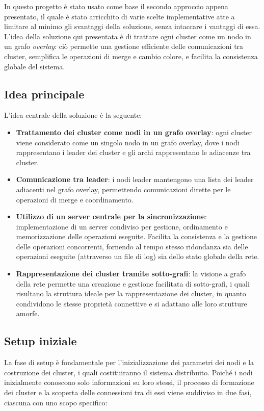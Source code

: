 \documentclass[12pt, a4paper]{report}
\begin{document}
In questo progetto \`e stato usato come base il secondo approccio appena presentato, il quale \`e stato arricchito di varie scelte implementative atte a limitare al minimo gli svantaggi della soluzione, senza intaccare i vantaggi di essa. L'idea della soluzione qui presentata \`e di trattare ogni cluster come un nodo in un grafo \emph{overlay}: ci\`o permette una gestione efficiente delle comunicazioni tra cluster, semplifica le operazioni di merge e cambio colore, e facilita la consistenza globale del sistema.

\subsection{Idea principale}

L'idea centrale della soluzione \`e la seguente:

\begin{itemize}
    \item \textbf{Trattamento dei cluster come nodi in un grafo overlay}: ogni cluster viene considerato come un singolo nodo in un grafo overlay, dove i nodi rappresentano i leader dei cluster e gli archi rappresentano le adiacenze tra cluster.
    \item \textbf{Comunicazione tra leader}: i nodi leader mantengono una lista dei leader adiacenti nel grafo overlay, permettendo comunicazioni dirette per le operazioni di merge e coordinamento.
    \item \textbf{Utilizzo di un server centrale per la sincronizzazione}: implementazione di un server condiviso per gestione, ordinamento e memorizzazione delle operazioni eseguite. Facilita la consistenza e la gestione delle operazioni concorrenti, fornendo al tempo stesso ridondanza sia delle operazioni eseguite (attraverso un file di log) sia dello stato globale della rete.
    \item \textbf{Rappresentazione dei cluster tramite sotto-grafi}: la visione a grafo della rete permette una creazione e gestione facilitata di sotto-grafi, i quali risultano la struttura ideale per la rappresentazione dei cluster, in quanto condividono le stesse propriet\`a connettive e si adattano alle loro strutture amorfe.
\end{itemize}

\subsection{Setup iniziale}

La fase di setup \`e fondamentale per l'inizializzazione dei parametri dei nodi e la costruzione dei cluster, i quali costituiranno il sistema distribuito. Poiché i nodi inizialmente conoscono solo informazioni su loro stessi, il processo di formazione dei cluster e la scoperta delle connessioni tra di essi viene suddiviso in due fasi, ciascuna con uno scopo specifico:
\end{document}
